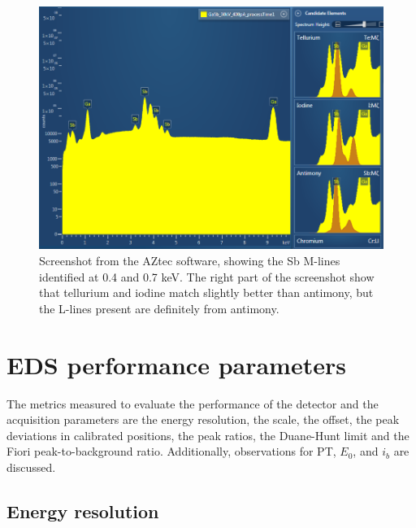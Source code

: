 \begin{figure}[htbp]
    \centering
    \includegraphics[width=0.95\linewidth]{figures/discussion/AZtec_Mlines.png}
    \caption{
        Screenshot from the AZtec software, showing the Sb M-lines identified at 0.4 and 0.7 keV.
        The right part of the screenshot show that tellurium and iodine match slightly better than antimony, but the L-lines present are definitely from antimony.
    }
    \label{fig:discussion:AZtec_Mlines}
\end{figure}

















\section{EDS performance parameters}
\label{discussion:performance}

The metrics measured to evaluate the performance of the detector and the acquisition parameters are the energy resolution, the scale, the offset, the peak deviations in calibrated positions, the peak ratios, the Duane-Hunt limit and the Fiori peak-to-background ratio.
Additionally, observations for PT, $E_0$, and $i_b$ are discussed.



\subsection{Energy resolution}
\label{discussion:energy_resolution}


